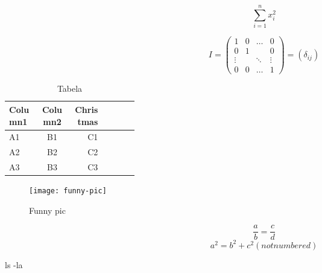 \documentclass[a4paper]{article}
\begin{document}
\[
\sum_{i=1}^n x_i^2
\]

\[
I =
\left(
\begin{array}{cccc}
1 & 0 & \ldots & 0 \\
0 & 1 & & 0 \\
\vdots & & \ddots & \vdots \\
0 & 0 & \ldots & 1
\end{array}
\right)
= \left(\delta_{ij}\right)
\]

\begin{table*}
\begin{center}
\begin{tabular}{|l|c|r| p{0.25\linewidth} |}
\hline
Column1 & Column2 & Christmas \\
\hline
A1 & B1 & C1 \\
\hline
A2 & B2 & C2 \\
\hline
A3 & B3 & C3 \\
\hline
\end{tabular}
\end{center}
\caption{Tabela}
\label{tab:tabela-letras}
\end{table*}

\begin{figure}
\texttt{[image: funny-pic]}\caption{Funny pic}
\end{figure}

\begin{equation}
\frac{a}{b} = \frac{c}{d}
\end{equation}
\begin{displaymath}
	a^2 = b^2 + c^2 (not numbered)
\end{displaymath}

\newcommand{\aliasl}{ls -la}
\aliasl
\end{document}

